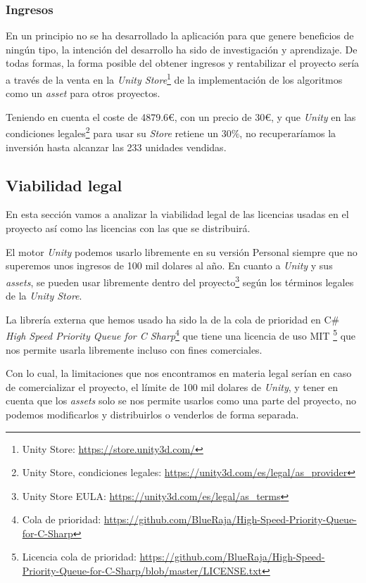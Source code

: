 \subsubsection{Ingresos}
En un principio no se ha desarrollado la aplicación para que genere beneficios de ningún tipo, la intención del desarrollo ha sido de investigación y aprendizaje. De todas formas, la forma posible del obtener ingresos y rentabilizar el proyecto sería a través de la venta en la \textit{Unity Store}\footnote{Unity Store: \url{https://store.unity3d.com/}} de la implementación de los algoritmos como un \textit{asset} para otros proyectos.

Teniendo en cuenta el coste de 4879.6\euro, con un precio de 30\euro, y que \textit{Unity} en las condiciones legales\footnote{Unity Store, condiciones legales: \url{https://unity3d.com/es/legal/as_provider}} para usar su \textit{Store} retiene un $30\%$, no recuperaríamos la inversión hasta alcanzar las 233 unidades vendidas.

\subsection{Viabilidad legal}
En esta sección vamos a analizar la viabilidad legal de las licencias usadas en el proyecto así como las licencias con las que se distribuirá.

El motor \textit{Unity}\cite{unityweb} podemos usarlo libremente en su versión Personal siempre que no superemos unos ingresos de 100 mil dolares al año. En cuanto a \textit{Unity} y sus \textit{assets}, se pueden usar libremente dentro del proyecto\footnote{Unity Store EULA: \url{https://unity3d.com/es/legal/as_terms}} según los términos legales de la \textit{Unity Store}.

La librería externa que hemos usado ha sido la de la cola de prioridad en C\# \textit{High Speed Priority Queue for C Sharp}\footnote{Cola de prioridad: \url{https://github.com/BlueRaja/High-Speed-Priority-Queue-for-C-Sharp}}\cite{bluerajacola} que tiene una licencia de uso MIT \footnote{Licencia cola de prioridad: \url{https://github.com/BlueRaja/High-Speed-Priority-Queue-for-C-Sharp/blob/master/LICENSE.txt}} que nos permite usarla libremente incluso con fines comerciales.

Con lo cual, la limitaciones que nos encontramos en materia legal serían en caso de comercializar el proyecto, el límite de 100 mil dolares de \textit{Unity}, y tener en cuenta que los \textit{assets} solo se nos permite usarlos como una parte del proyecto, no podemos modificarlos y distribuirlos o venderlos de forma separada.

